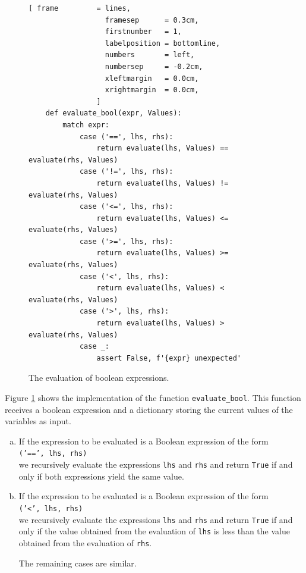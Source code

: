 \begin{figure}[!ht]
\centering
\begin{Verbatim}[ frame         = lines, 
                  framesep      = 0.3cm, 
                  firstnumber   = 1,
                  labelposition = bottomline,
                  numbers       = left,
                  numbersep     = -0.2cm,
                  xleftmargin   = 0.0cm,
                  xrightmargin  = 0.0cm,
                ]
    def evaluate_bool(expr, Values):
        match expr:
            case ('==', lhs, rhs):
                return evaluate(lhs, Values) == evaluate(rhs, Values)
            case ('!=', lhs, rhs):
                return evaluate(lhs, Values) != evaluate(rhs, Values)
            case ('<=', lhs, rhs):
                return evaluate(lhs, Values) <= evaluate(rhs, Values)
            case ('>=', lhs, rhs):
                return evaluate(lhs, Values) >= evaluate(rhs, Values)
            case ('<', lhs, rhs):
                return evaluate(lhs, Values) <  evaluate(rhs, Values)
            case ('>', lhs, rhs):
                return evaluate(lhs, Values) >  evaluate(rhs, Values)
            case _:
                assert False, f'{expr} unexpected'
\end{Verbatim}
\vspace*{-0.3cm}
\caption{The evaluation of boolean expressions.}
\label{fig:Interpreter.ipynb:evaluate_bool}
\end{figure}

Figure \ref{fig:Interpreter.ipynb:evaluate_bool} shows the implementation of the function \texttt{evaluate\_bool}.
This function receives a boolean expression and a dictionary storing the current values of the variables as input.
\begin{enumerate}[(a)]
\item If the expression to be evaluated is a Boolean expression of the form
      \\[0.2cm]
      \hspace*{1.3cm}
      \texttt{('==', lhs, rhs)}
      \\[0.2cm]
      we recursively evaluate the expressions \texttt{lhs} and \texttt{rhs} and return \texttt{True} if and only if
      both expressions yield the same value.
\item If the expression to be evaluated is a Boolean expression of the form
      \\[0.2cm]
      \hspace*{1.3cm}
      \texttt{('<', lhs, rhs)}
      \\[0.2cm]
      we recursively evaluate the expressions \texttt{lhs} and \texttt{rhs} and return \texttt{True} if and only if
      the value obtained from the evaluation of \texttt{lhs} is less than the
      value obtained from the evaluation of \texttt{rhs}.

      The remaining cases are similar.
\end{enumerate}

